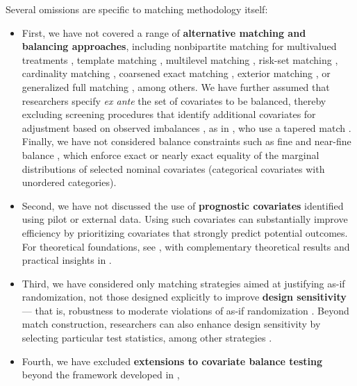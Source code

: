 \documentclass[twoside,11pt]{article}
\begin{document}
Several omissions are specific to matching methodology itself:

\begin{itemize}
\item
  First, we have not covered a range of \textbf{alternative matching and
  balancing approaches}, including nonbipartite matching for multivalued
  treatments
  \citep[pp.~207--221]{luetal2001, luetal2011, rosenbaum2010}, template
  matching \citep{silberetal2014}, multilevel matching
  \citep{zubizarretakeele2017, pimenteletal2018}, risk-set matching
  \citep{lietal2001}, cardinality matching \citep{zubizarretaetal2014},
  coarsened exact matching \citep{iacusetal2012}, exterior matching
  \citep{rosenbaumsilber2013}, or generalized full matching
  \citep{savjeetal2021}, among others. We have further assumed that
  researchers specify \emph{ex ante} the set of covariates to be
  balanced, thereby excluding screening procedures that identify
  additional covariates for adjustment based on observed imbalances
  \citep{cochran1965}, as in \citet{yuetal2021}, who use a tapered match \citep{danieletal2008}. Finally, we have not considered
  balance constraints such as fine and near-fine balance
  \citep{rosenbaumetal2007, yangetal2012, yu2023, pimenteletal2015a, pimenteletal2015b},
  which enforce exact or nearly exact equality of the marginal
  distributions of selected nominal covariates (categorical covariates
  with unordered categories).
\item
  Second, we have not discussed the use of \textbf{prognostic
  covariates} identified using pilot or external data. Using such covariates
  can substantially improve efficiency by prioritizing covariates that
  strongly predict potential outcomes. For theoretical foundations, see
  \citet{hansen2008a}, with complementary theoretical results and
  practical insights in \citet{salesetal2018}.
\item
  Third, we have considered only matching strategies aimed at justifying
  as-if randomization, not those designed explicitly to improve
  \textbf{design sensitivity} --- that is, robustness to moderate
  violations of as-if randomization \citep[see][Part~III,
  pp.~257--311]{rosenbaum2010}. Beyond match construction, researchers
  can also enhance design sensitivity by selecting particular test
  statistics, among other strategies
  \citep{rosenbaum2004, helleretal2009, hsuetal2013, smalletal2013}.
\item
  Fourth, we have excluded \textbf{extensions to covariate balance
  testing} beyond the framework developed in \citet{hansenbowers2008},

\end{itemize}
\end{document}

